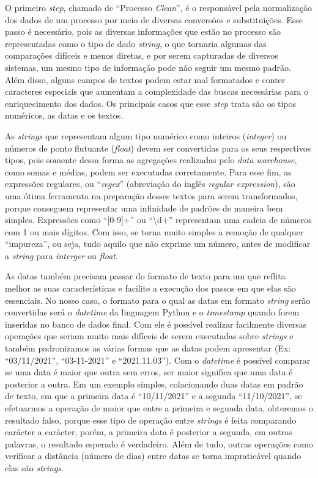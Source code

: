 O primeiro \textit{step}, chamado de \enquote{Processo \textit{Clean}}, é o responsável pela normalização dos dados de um processo por meio de diversas conversões e substituições. Esse passo é necessário, pois as diversas informações que estão no processo são representadas como o tipo de dado \textit{string}, o que tornaria algumas das comparações difíceis e menos diretas, e por serem capturadas de diversos sistemas, um mesmo tipo de informação pode não seguir um mesmo padrão. Além disso, alguns campos de textos podem estar mal formatados e conter caracteres especiais que aumentam a complexidade das buscas necessárias para o enriquecimento dos dados. Os principais casos que esse \textit{step} trata são os tipos numéricos, as datas e os textos.

As \textit{strings} que representam algum tipo numérico como inteiros (\textit{integer}) ou números de ponto flutuante (\textit{float}) devem ser convertidas para os seus respectivos tipos, pois somente dessa forma as agregações realizadas pelo \textit{data warehouse}, como somas e médias, podem ser executadas corretamente. Para esse fim, as expressões regulares, ou \enquote{\textit{regex}} (abreviação do inglês \textit{regular expression}), são uma ótima ferramenta na preparação desses textos para serem transformados, porque conseguem representar uma infinidade de padrões de maneira bem simples. Expressões como \enquote{[0-9]+} ou \enquote{\textbackslash d+} representam uma cadeia de números com 1 ou mais dígitos. Com isso, se torna muito simples a remoção de qualquer \enquote{impureza}, ou seja, tudo aquilo que não exprime um número, antes de modificar a \textit{string} para \textit{interger} ou \textit{float}.

As datas também precisam passar do formato de texto para um que reflita melhor as suas características e facilite a execução dos passos em que elas são essenciais. No nosso caso, o formato para o qual as datas em formato \textit{string} serão convertidas será o \textit{datetime} da linguagem Python e o \textit{timestamp} quando forem inseridas no banco de dados final. Com ele é possível realizar facilmente diversas operações que seriam muito mais difíceis de serem executadas sobre \textit{strings} e também padronizamos as várias formas que as datas podem apresentar (Ex: \enquote{03/11/2021}, \enquote{03-11-2021} e \enquote{2021.11.03}). Com o \textit{datetime} é possível comparar se uma data é maior que outra sem erros, ser maior significa que uma data é posterior a outra. Em um exemplo simples, colacionando duas datas em padrão de texto, em que a primeira data é \enquote{10/11/2021} e a segunda \enquote{11/10/2021}, se efetuarmos a operação de maior que entre a primeira e segunda data, obteremos o resultado falso, porque esse tipo de operação entre \textit{strings} é feita comparando carácter a carácter, porém, a primeira data é posterior a segunda, em outras palavras, o resultado esperado é verdadeiro. Além de tudo, outras operações como verificar a distância (número de dias) entre datas se torna impraticável quando elas são \textit{strings}.

